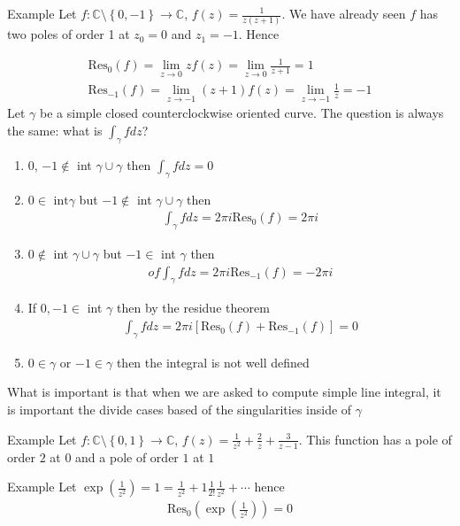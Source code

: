 	\begin{parag}{Example}
		Let $f  : \mathbb{C} \setminus \left\{0, -1\right\} \to \mathbb{C}$, $f\left(z\right) = \frac{1}{z\left(z + 1\right)} $. We have already seen $f$ has two poles of order 1 at $z_0 = 0$ and $z_1 =  -1$. Hence

		\begin{align*} 
			\text{Res}_{0}\left(f\right) = \lim_{z \to 0} zf\left(z\right)  = \lim_{z \to 0} \frac{1}{z + 1} = 1\\
			\text{Res}_{-1}\left(f\right) =  \lim_{z \to -1} \left(z + 1\right)f\left(z\right) =  \lim_{z \to -1} \frac{1}{z} = -1

		\end{align*}
		Let $\gamma$ be a simple closed counterclockwise oriented curve. The question is always the same: what is $\int_{\gamma}fdz$?
		\begin{enumerate}
		    \item 0, $-1 \notin $ int $\gamma \cup \gamma$ then $\int_{\gamma}fdz = 0$
		    \item $0 \in \text{ int}\gamma$ but $-1 \notin $ int $\gamma \cup \gamma$ then 
				\begin{align*} 
					\int_{\gamma}fdz =  2\pi i \text{Res}_0\left(f\right) = 2\pi i 
				\end{align*}
				\item $0 \notin $ int $\gamma \cup \gamma$ but $-1 \in $ int $\gamma$ then 
					\begin{align*}of  
						\int_{\gamma}fdz =  2\pi i \text{Res}_{-1}\left(f\right) = -2\pi i
					\end{align*}
					\item If $0, -1 \in $ int $\gamma$ then by the residue theorem 
						\begin{align*} 
							\int_{\gamma}fdz = 2\pi i \left[\text{Res}_0\left(f\right) + \text{Res}_{-1}\left(f\right)\right] = 0
						\end{align*}
					\item $0 \in \gamma$ or $-1 \in \gamma$ then the integral is not well defined
		\end{enumerate}
		What is important is that when we are asked to compute simple line integral, it is important the divide cases based of the singularities inside of $\gamma$
	\end{parag}

	\begin{parag}{Example}
	    Let $f : \mathbb{C} \setminus \left\{0, 1\right\} \to \mathbb{C}$, $f\left(z\right) =  \frac{1}{z^2} + \frac{2}{z} + \frac{3}{z - 1}$. This function has a pole of order $2$ at $0$ and a pole of order $1$ at $1$
	\end{parag}
\begin{parag}{Example}
    Let $\exp\left(\frac{1}{z^2}\right) =  1 = \frac{1}{z^2} + 1\frac{1}{2!}\frac{1}{z^2} + \cdots$ hence 
	\begin{align*} 
		\text{Res}_0\left(\exp\left(\frac{1}{z^2}\right)\right) =  0
	\end{align*}
\end{parag}

